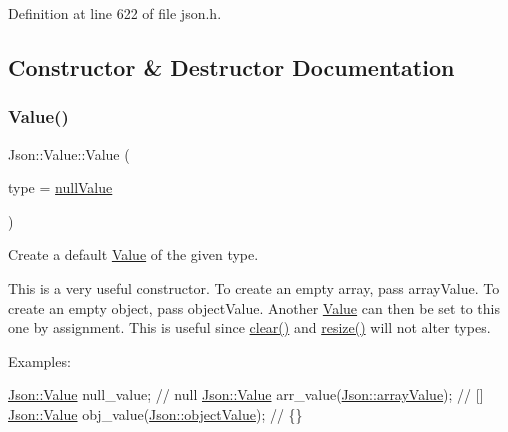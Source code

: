 Definition at line 622 of file json.\+h.



\subsection{Constructor \& Destructor Documentation}
\hypertarget{class_json_1_1_value_ada6ba1369448fb0240bccc36efaa46f7}{}\label{class_json_1_1_value_ada6ba1369448fb0240bccc36efaa46f7} 
\subsubsection{\texorpdfstring{Value()}{Value()}\hspace{0.1cm}{\footnotesize\ttfamily [1/24]}}
{\footnotesize\ttfamily Json\+::\+Value\+::\+Value (\begin{DoxyParamCaption}\item[{\hyperlink{namespace_json_a7d654b75c16a57007925868e38212b4e}{Value\+Type}}]{type = {\ttfamily \hyperlink{namespace_json_a7d654b75c16a57007925868e38212b4ea99922f3ccd58446e80e6055a7119b640}{null\+Value}} }\end{DoxyParamCaption})}



Create a default \hyperlink{class_json_1_1_value}{Value} of the given type. 

This is a very useful constructor. To create an empty array, pass array\+Value. To create an empty object, pass object\+Value. Another \hyperlink{class_json_1_1_value}{Value} can then be set to this one by assignment. This is useful since \hyperlink{class_json_1_1_value_a501a4d67e6c875255c2ecc03ccd2019b}{clear()} and \hyperlink{class_json_1_1_value_aa284353271ada427dbfa04a42f2be407}{resize()} will not alter types. \begin{DoxyVerb}Examples:
\end{DoxyVerb}
 
\begin{DoxyCode}
\hyperlink{class_json_1_1_value}{Json::Value} null\_value; \textcolor{comment}{// null}
\hyperlink{class_json_1_1_value}{Json::Value} arr\_value(\hyperlink{namespace_json_a7d654b75c16a57007925868e38212b4eaa3025bfd271ef0b0c7c030c9118f8be7}{Json::arrayValue}); \textcolor{comment}{// []}
\hyperlink{class_json_1_1_value}{Json::Value} obj\_value(\hyperlink{namespace_json_a7d654b75c16a57007925868e38212b4ea6ca35c0a30ea3d1b8ec95c2d1e41a1a8}{Json::objectValue}); \textcolor{comment}{// \{\}}
\end{DoxyCode}
 

